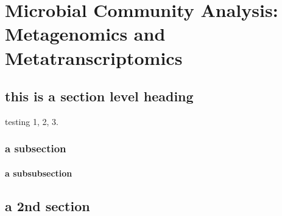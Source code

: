 \chapter{Microbial Community Analysis: Metagenomics and Metatranscriptomics}
\label{chapter:B}

\section{this is a section level heading}
testing 1, 2, 3.

\subsection{a subsection}

\subsubsection{a subsubsection}

\section{a 2nd section}



